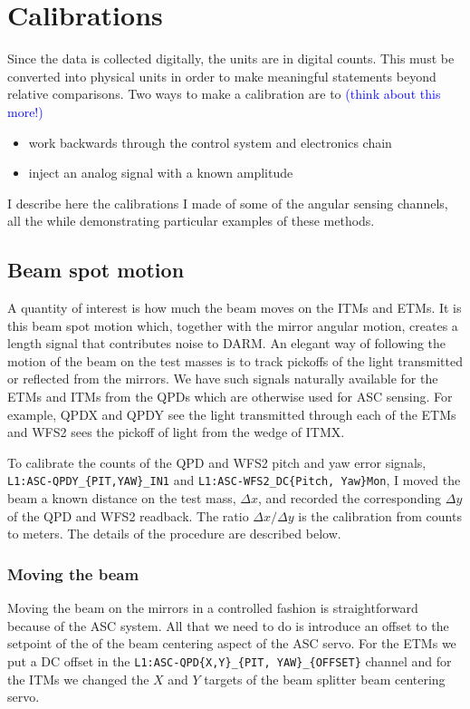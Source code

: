 \section{Calibrations}
Since the data is collected digitally, the units are in digital
counts. This must be converted into physical units in order to make
meaningful statements beyond relative comparisons. Two ways to make a
calibration are to \textcolor{blue}{(think about this more!)}
\begin{itemize}
\item work backwards through the control system and electronics chain \vspace{-10pt}
\item inject an analog signal with a known amplitude 
\end{itemize}
I describe here the calibrations I made of some of the angular sensing
channels, all the while demonstrating particular examples of these
methods.


\subsection{Beam spot motion}
A quantity of interest is how much the beam moves on the ITMs and
ETMs. It is this beam spot motion which, together with the mirror
angular motion, creates a length signal that contributes noise to
DARM. An elegant way of following the motion of the beam on the test
masses is to track pickoffs of the light transmitted or reflected from
the mirrors. We have such signals naturally available for the ETMs and
ITMs from the QPDs which are otherwise used for ASC sensing. For
example, QPDX and QPDY see the light transmitted through each of the
ETMs and WFS2 sees the pickoff of light from the wedge of ITMX.

To calibrate the counts of the QPD and WFS2 pitch and yaw error
signals, \linebreak \texttt{L1:ASC-QPDY\_\{PIT,YAW\}\_IN1} and
\texttt{L1:ASC-WFS2\_DC\{Pitch, Yaw\}Mon}, I moved the beam a
known distance on the test mass, $\Delta x$, and recorded the
corresponding $\Delta y$ of the QPD and WFS2 readback. The ratio
$\Delta x /\Delta y$ is the calibration from counts to meters. The
details of the procedure are described below.


\subsubsection{Moving the beam} 
Moving the beam on the mirrors in a controlled fashion is
straightforward because of the ASC system. All that we need to do is
introduce an offset to the setpoint of the of the beam centering
aspect of the ASC servo. For the ETMs we put a DC offset in the
\texttt{L1:ASC-QPD\{X,Y\}\_\{PIT, YAW\}\_\{OFFSET\}} channel and for
the ITMs we changed the $X$ and $Y$ targets of the beam splitter beam
centering servo.

